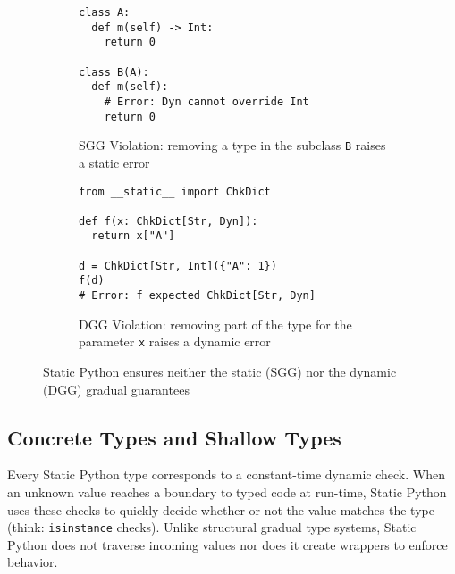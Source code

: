 \documentclass[english,cleveref,submission]{programming}
\newcommand{\SP}{Static Python}
\newcommand{\code}[1]{\texttt{#1}}
\begin{document}
\begin{figure}
  \begin{subfigure}[t]{0.48\columnwidth}
    \begin{lstlisting}
class A:
  def m(self) -> Int:
    return 0

class B(A):
  def m(self):
    # Error: Dyn cannot override Int
    return 0
  \end{lstlisting}
    \caption{SGG Violation: removing a type in the subclass \code{B} raises a static error}
    \label{f:gg-failure-stat}
  \end{subfigure}
  \hfill
  \begin{subfigure}[t]{0.48\columnwidth}
  \begin{lstlisting}
from __static__ import ChkDict

def f(x: ChkDict[Str, Dyn]):
  return x["A"]

d = ChkDict[Str, Int]({"A": 1})
f(d)
# Error: f expected ChkDict[Str, Dyn]
  \end{lstlisting}
    \caption{DGG Violation: removing part of the type for the parameter \code{x} raises a dynamic error}
    \label{f:gg-failure-dyn}
  \end{subfigure}
  \caption{\SP{} ensures neither the static (SGG) nor the dynamic (DGG) gradual guarantees}
  \label{fig:gg-failure}
\end{figure}



\subsection{Concrete Types and Shallow Types}
\label{s:checked-type}

Every \SP{} type corresponds to a constant-time dynamic check.
When an unknown value reaches a boundary to typed code at run-time,
\SP{} uses these checks to quickly decide whether or not the value
matches the type (think: \code{isinstance} checks).
Unlike structural gradual type systems, \SP{} does not traverse
incoming values nor does it create wrappers to enforce behavior.
\end{document}
